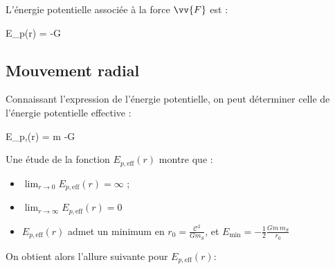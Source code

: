 \documentclass{cours}
\begin{document}
L'énergie potentielle associée à la force $\vv{F}$ est :
\begin{eqencadre}
  E_p(r) = -G
\end{eqencadre}

\subsection{Mouvement radial}%
\label{sub:mouvement_radial}
Connaissant l'expression de l'énergie potentielle, on peut déterminer celle de l'énergie potentielle effective :
\newcommand{\Epeff}{E_{p,}}
\begin{eqencadre}
  \Epeff(r) = m -G
\end{eqencadre}
Une étude de la fonction $\Epeff(r)$ montre que : 
\begin{itemize}
  \item $\displaystyle\lim_{r\rightarrow 0} \Epeff(r) = \infty$ ;
  \item $\displaystyle\lim_{r\rightarrow \infty} \Epeff(r) = 0$
  \item $\Epeff(r)$ admet un minimum en $r_0=\frac{\mathscr{C}^2}{Gm_S}$, et $E_\text{min}=-\frac{1}{2}\frac{Gm\,m_S}{r_0}$  
\end{itemize}
On obtient alors l'allure suivante pour $\Epeff(r)$:
\begin{center}
\end{center}
\end{document}
